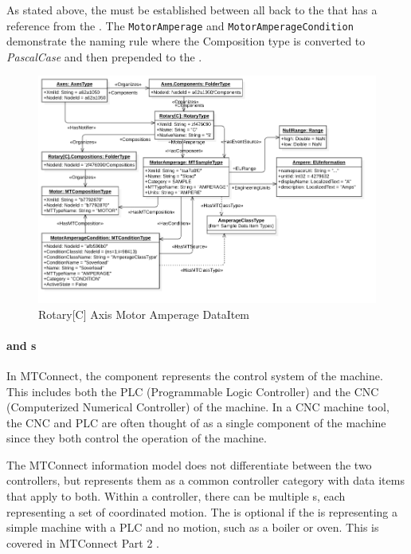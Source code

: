 As stated above, the   must be established between all  back to the  that has a reference from the . The \texttt{MotorAmperage} and \texttt{MotorAmperageCondition} demonstrate the naming rule where the Composition type is converted to \textit{PascalCase} and then prepended to the  . 

\begin{figure}[ht]
    \centering
    \includegraphics[width=1.0\textwidth]{diagrams/mtconnect-mapping/rotary-c-amperage.png}
    \caption{Rotary[C] Axis Motor Amperage DataItem}
    \label{fig:rotary-c-amperage}
\end{figure}

\FloatBarrier

\paragraph{ and  s}

In MTConnect, the  component represents the control system of the machine. This includes both the PLC (Programmable Logic Controller) and the CNC (Computerized Numerical Controller) of the machine. In a CNC machine tool, the CNC and PLC are often thought of as a single component of the machine since they both control the operation of the machine.

The MTConnect information model does not differentiate between the two controllers, but represents them as a common controller category with data items that apply to both. Within a controller, there can be multiple s, each representing a set of coordinated motion. The  is optional if the  is representing a simple machine with a PLC and no motion, such as a boiler or oven. This is covered in MTConnect Part 2 \cite{MTCPart2}.

